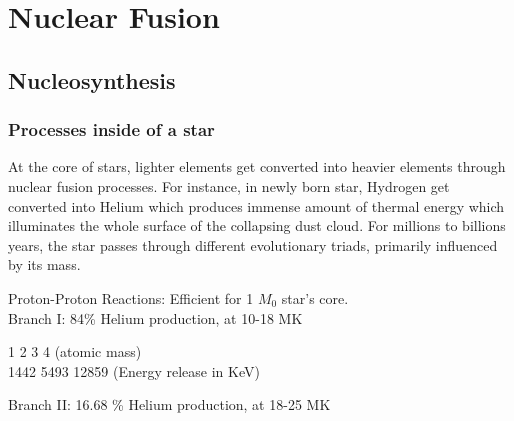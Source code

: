\chapter{Nuclear Fusion}

\section{Nucleosynthesis}
 
\subsection{Processes inside of a star}
 At the core of stars, lighter elements get converted into heavier elements through nuclear fusion processes. For instance, in newly born star, Hydrogen get converted into Helium which produces immense amount of thermal energy which illuminates the whole surface of the collapsing dust cloud. For millions to billions years, the star passes through different evolutionary triads, primarily influenced by its mass.  
 
 \vspace{1 cm}
 
 Proton-Proton Reactions: Efficient for 1 $M_0$ star's core. \\
 
 \hspace{3cm} Branch I: 84\% Helium production, at 10-18 MK
 
 \begin{center}
 \end{center}
 \vspace{-2mm}
 
 \hspace{5.9cm} {\scriptsize 1 \hspace{0.8cm} 2 \hspace{0.9cm} 3 \hspace{0.9cm} 4   \hfill (atomic mass) \\
 	\vspace{-3mm}
 	\hspace{6.7cm} 1442 \hspace{0.5cm} 5493 \hspace{0.5cm} 12859 \hspace{0.9cm} \hfill (Energy release in KeV)}
 
 
 
 \vspace{5mm}
 \hspace{3cm} Branch II: 16.68 \% Helium production, at 18-25 MK
 
